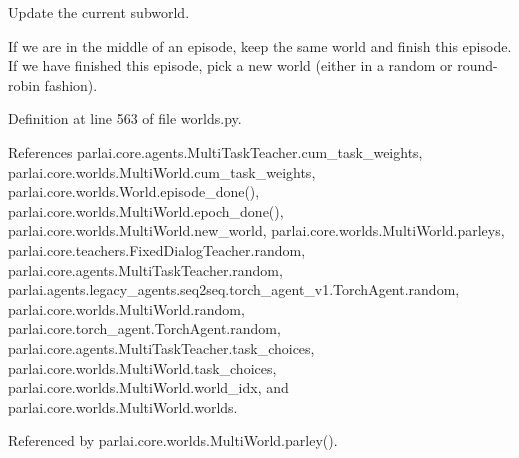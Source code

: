 \begin{DoxyVerb}Update the current subworld.

If we are in the middle of an episode, keep the same world and finish this
episode. If we have finished this episode, pick a new world (either in a
random or round-robin fashion).
\end{DoxyVerb}
 

Definition at line 563 of file worlds.\+py.



References parlai.\+core.\+agents.\+Multi\+Task\+Teacher.\+cum\+\_\+task\+\_\+weights, parlai.\+core.\+worlds.\+Multi\+World.\+cum\+\_\+task\+\_\+weights, parlai.\+core.\+worlds.\+World.\+episode\+\_\+done(), parlai.\+core.\+worlds.\+Multi\+World.\+epoch\+\_\+done(), parlai.\+core.\+worlds.\+Multi\+World.\+new\+\_\+world, parlai.\+core.\+worlds.\+Multi\+World.\+parleys, parlai.\+core.\+teachers.\+Fixed\+Dialog\+Teacher.\+random, parlai.\+core.\+agents.\+Multi\+Task\+Teacher.\+random, parlai.\+agents.\+legacy\+\_\+agents.\+seq2seq.\+torch\+\_\+agent\+\_\+v1.\+Torch\+Agent.\+random, parlai.\+core.\+worlds.\+Multi\+World.\+random, parlai.\+core.\+torch\+\_\+agent.\+Torch\+Agent.\+random, parlai.\+core.\+agents.\+Multi\+Task\+Teacher.\+task\+\_\+choices, parlai.\+core.\+worlds.\+Multi\+World.\+task\+\_\+choices, parlai.\+core.\+worlds.\+Multi\+World.\+world\+\_\+idx, and parlai.\+core.\+worlds.\+Multi\+World.\+worlds.



Referenced by parlai.\+core.\+worlds.\+Multi\+World.\+parley().


